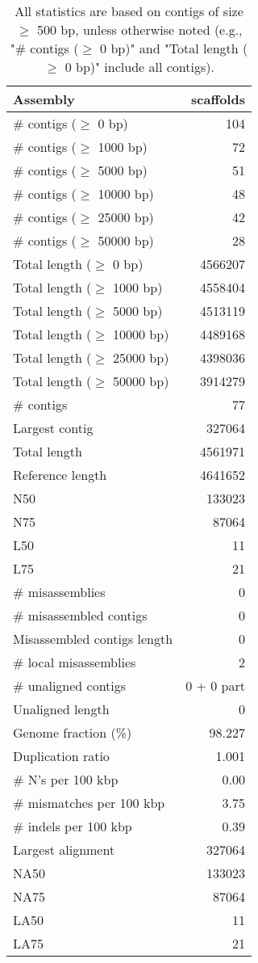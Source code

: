 \documentclass[12pt,a4paper]{article}
\begin{document}
\begin{table}[ht]
\begin{center}
\caption{All statistics are based on contigs of size $\geq$ 500 bp, unless otherwise noted (e.g., "\# contigs ($\geq$ 0 bp)" and "Total length ($\geq$ 0 bp)" include all contigs).}
\begin{tabular}{|l*{1}{|r}|}
\hline
Assembly & scaffolds \\ \hline
\# contigs ($\geq$ 0 bp) & 104 \\ \hline
\# contigs ($\geq$ 1000 bp) & 72 \\ \hline
\# contigs ($\geq$ 5000 bp) & 51 \\ \hline
\# contigs ($\geq$ 10000 bp) & 48 \\ \hline
\# contigs ($\geq$ 25000 bp) & 42 \\ \hline
\# contigs ($\geq$ 50000 bp) & 28 \\ \hline
Total length ($\geq$ 0 bp) & 4566207 \\ \hline
Total length ($\geq$ 1000 bp) & 4558404 \\ \hline
Total length ($\geq$ 5000 bp) & 4513119 \\ \hline
Total length ($\geq$ 10000 bp) & 4489168 \\ \hline
Total length ($\geq$ 25000 bp) & 4398036 \\ \hline
Total length ($\geq$ 50000 bp) & 3914279 \\ \hline
\# contigs & 77 \\ \hline
Largest contig & 327064 \\ \hline
Total length & 4561971 \\ \hline
Reference length & 4641652 \\ \hline
N50 & 133023 \\ \hline
N75 & 87064 \\ \hline
L50 & 11 \\ \hline
L75 & 21 \\ \hline
\# misassemblies & 0 \\ \hline
\# misassembled contigs & 0 \\ \hline
Misassembled contigs length & 0 \\ \hline
\# local misassemblies & 2 \\ \hline
\# unaligned contigs & 0 + 0 part \\ \hline
Unaligned length & 0 \\ \hline
Genome fraction (\%) & 98.227 \\ \hline
Duplication ratio & 1.001 \\ \hline
\# N's per 100 kbp & 0.00 \\ \hline
\# mismatches per 100 kbp & 3.75 \\ \hline
\# indels per 100 kbp & 0.39 \\ \hline
Largest alignment & 327064 \\ \hline
NA50 & 133023 \\ \hline
NA75 & 87064 \\ \hline
LA50 & 11 \\ \hline
LA75 & 21 \\ \hline
\end{tabular}
\end{center}
\end{table}
\end{document}

